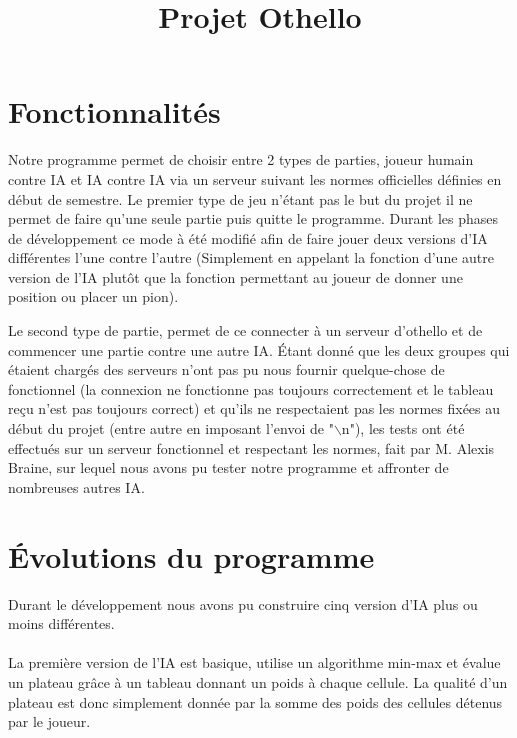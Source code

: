 \documentclass[a4paper,10pt]{article}
\title{Projet Othello}
\author{\bsc{Kevin Hivert} \bsc{Ronan Abhamon}}
\date{}
\begin{document}
\maketitle

\section{Fonctionnalités}
\noindent
Notre programme permet de choisir entre 2 types de parties, joueur humain contre IA et IA contre IA via un serveur suivant les normes officielles définies en début de semestre.
Le premier type de jeu n'étant pas le but du projet il ne permet de faire qu'une seule partie puis quitte le programme. Durant les phases de développement ce mode à été modifié afin de faire jouer deux versions d'IA différentes l'une contre l'autre (Simplement en appelant la fonction d'une autre version de l'IA plutôt que la fonction permettant au joueur de donner une position ou placer un pion).
~\par Le second type de partie, permet de ce connecter à un serveur d'othello et de commencer une partie contre une autre IA.
Étant donné que les deux groupes qui étaient chargés des serveurs n'ont pas pu nous fournir quelque-chose de fonctionnel (la connexion ne fonctionne pas toujours correctement et le tableau reçu n'est pas toujours correct) et qu'ils ne respectaient pas les normes fixées au début du projet (entre autre en imposant l'envoi de "$\backslash$n"), les tests ont été effectués sur un serveur fonctionnel et respectant les normes, fait par M. Alexis Braine, sur lequel nous avons pu tester notre programme et affronter de nombreuses autres IA.

\section{Évolutions du programme}
\noindent
Durant le développement nous avons pu construire cinq version d'IA plus ou moins différentes.

\paragraph{}La première version de l'IA est basique, utilise un algorithme min-max et évalue un plateau grâce à un tableau donnant un poids à chaque cellule. La qualité d'un plateau est donc simplement donnée par la somme des poids des cellules détenus par le joueur.
\end{document}
